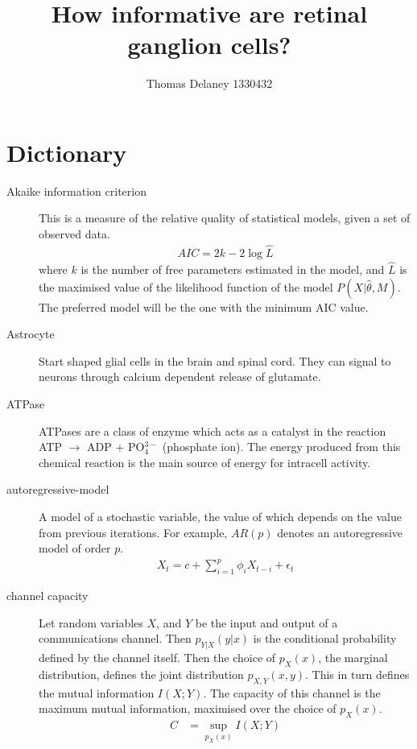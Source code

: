 \documentclass[a4paper,12pt]{article}
\title{How informative are retinal ganglion cells?}
\author{Thomas Delaney 1330432}
\theoremstyle{definition}
\begin{document}
 \thispagestyle{plain}
 \section*{Dictionary}
 \begin{description}
 \item[Akaike information criterion] This is a measure of the relative quality of statistical models, given a set of observed data.
 	\begin{align*}
 	AIC = 2k - 2\log \hat{L}
 	\end{align*}
 	where $k$ is the number of free parameters estimated in the model, and $\hat{L}$ is the maximised value of the likelihood function of the model $P(X|\hat{\theta}, M)$. The preferred model will be the one with the minimum AIC value.

 \item[Astrocyte] Start shaped glial cells in the brain and spinal cord. They can signal to neurons through calcium dependent release of glutamate.

  \item[ATPase] ATPases are a class of enzyme which acts as a catalyst in the reaction ATP $\rightarrow$ ADP $+$ PO$^{3-}_4$ (phosphate ion). The energy produced from this chemical reaction is the main source of energy for intracell activity.

 \item[autoregressive-model] A model of a stochastic variable, the value of which depends on the value from previous iterations. For example, $AR(p)$ denotes an autoregressive model of order $p$.
 	\begin{align*}
 	X_t = c + \sum_{i=1}^p \phi_i X_{t-i} + \epsilon_t
 	\end{align*}

  \item[channel capacity] Let random variables $X$, and $Y$ be the input and output of a communications channel. Then $p_{Y|X}(y|x)$ is the conditional probability defined by the channel itself. Then the choice of $p_{X}(x)$, the marginal distribution, defines the joint distribution $p_{X,Y}(x,y)$. This in turn defines the mutual information $I(X;Y)$. The capacity of this channel is the maximum mutual information, maximised over the choice of $p_{X}(x)$.
  \begin{align}
  C &= \sup_{p_{X}(x)} I(X;Y)
  \end{align}


\end{description}
\end{document}
